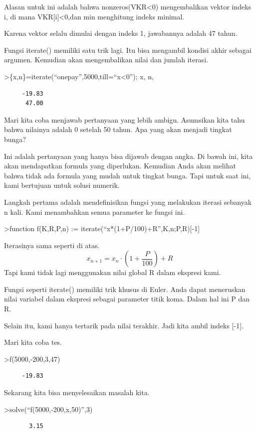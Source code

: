 \documentclass[
]{book}
\begin{document}
Alasan untuk ini adalah bahwa nonzeros(VKR\textless0) mengembalikan vektor indeks i, di mana VKR{[}i{]}\textless0,dan min menghitung indeks minimal.

Karena vektor selalu dimulai dengan indeks 1, jawabannya adalah 47 tahun.

Fungsi iterate() memiliki satu trik lagi. Itu bisa mengambil kondisi akhir sebagai argumen. Kemudian akan mengembalikan nilai dan jumlah iterasi.

\textgreater\{x,n\}=iterate(``onepay'',5000,till=``x\textless0''); x, n,

\begin{verbatim}
     -19.83 
      47.00 
\end{verbatim}

Mari kita coba menjawab pertanyaan yang lebih ambigu. Asumsikan kita tahu bahwa nilainya adalah 0 setelah 50 tahun. Apa yang akan menjadi tingkat bunga?

Ini adalah pertanyaan yang hanya bisa dijawab dengan angka. Di bawah ini, kita akan mendapatkan formula yang diperlukan. Kemudian Anda akan melihat bahwa tidak ada formula yang mudah untuk tingkat bunga. Tapi untuk saat ini, kami bertujuan untuk solusi numerik.

Langkah pertama adalah mendefinisikan fungsi yang melakukan iterasi sebanyak n kali. Kami menambahkan semua parameter ke fungsi ini.

\textgreater function f(K,R,P,n) := iterate(``x*(1+P/100)+R'',K,n;P,R){[}-1{]}

Iterasinya sama seperti di atas. \[x_{n+1} = x_n \cdot \left(1+ \frac{P}{100}\right) + R\] Tapi kami tidak lagi menggunakan nilai global R dalam ekspresi kami.

Fungsi seperti iterate() memiliki trik khusus di Euler. Anda dapat meneruskan nilai variabel dalam ekspresi sebagai parameter titik koma. Dalam hal ini P dan R.

Selain itu, kami hanya tertarik pada nilai terakhir. Jadi kita ambil indeks {[}-1{]}.

Mari kita coba tes.

\textgreater f(5000,-200,3,47)

\begin{verbatim}
     -19.83 
\end{verbatim}

Sekarang kita bisa menyelesaikan masalah kita.

\textgreater solve(``f(5000,-200,x,50)'',3)

\begin{verbatim}
       3.15 
\end{verbatim}
\end{document}
